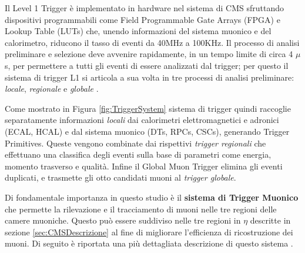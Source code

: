Il Level 1 Trigger è implementato in hardware nel sistema di CMS sfruttando dispositivi programmabili come Field Programmable Gate Arrays (FPGA) e Lookup Table (LUTs) che, unendo informazioni del sistema muonico e del calorimetro, riducono il tasso di eventi da 40MHz a 100KHz. Il processo di analisi preliminare e selezione deve avvenire rapidamente, in un tempo limite di circa 4 $\mu$s, per permettere a tutti gli eventi di essere analizzati dal trigger; per questo il sistema di trigger L1 si articola a sua volta in tre processi di analisi preliminare: \textit{locale}, \textit{regionale} e \textit{globale} \cite{MasterThesisNicLai}.

Come mostrato in Figura \ref{fig:TriggerSystem} sistema di trigger quindi raccoglie separatamente informazioni \textit{locali} dai calorimetri elettromagnetici e adronici (ECAL, HCAL) e dal sistema muonico (DTs, RPCs, CSCs), generando Trigger Primitives. Queste vengono combinate dai rispettivi \textit{trigger regionali} che effettuano una classifica degli eventi sulla base di parametri come energia, momento trasverso e qualità. Infine il Global Muon Trigger elimina gli eventi duplicati, e trasmette gli otto candidati muoni al \textit{trigger globale}. 


Di fondamentale importanza in questo studio è il \textbf{sistema di Trigger Muonico} che permette la rilevazione e il tracciamento di muoni nelle tre regioni delle camere muoniche. Questo può essere suddiviso nelle tre regioni in $\eta$ descritte in sezione \ref{sec:CMSDescrizione} al fine di migliorare l'efficienza di ricostruzione dei muoni. Di seguito è riportata una più dettagliata descrizione di questo sistema \cite{sirunyan2020performance}.


